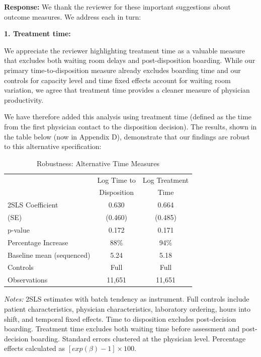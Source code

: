 \documentclass[11pt]{article}
\newcommand{\1}{\hbox{\rm 1\kern-.35em 1}}
\begin{document}
\noindent\textbf{Response:} \color{blue}We thank the reviewer for these important suggestions about outcome measures. We address each in turn:

\textbf{1. Treatment time:} 

We appreciate the reviewer highlighting treatment time as a valuable measure that excludes both waiting room delays and post-disposition boarding. While our primary time-to-disposition measure already excludes boarding time and our controls for capacity level and time fixed effects account for waiting room variation, we agree that treatment time provides a cleaner measure of physician productivity. 

We have therefore added this analysis using treatment time (defined as the time from the first physician contact to the disposition decision). The results, shown in the table below (now in Appendix D), demonstrate that our findings are robust to this alternative specification:

\begin{table}[H]
\centering
\caption*{Robustness: Alternative Time Measures}
\begin{threeparttable}
\begin{tabular}{lcc}
\toprule 
& Log Time to & Log Treatment \\ 
& Disposition & Time \\ 
\midrule
2SLS Coefficient & 0.630 & 0.664 \\
(SE) & (0.460) & (0.485) \\
p-value & 0.172 & 0.171 \\
\midrule
Percentage Increase & 88\% & 94\% \\
Baseline mean (sequenced) & 5.24 & 5.18 \\
\midrule
Controls & Full & Full \\
Observations & 11,651 & 11,651 \\
\bottomrule
\end{tabular}
\begin{tablenotes}
\footnotesize
\item \textit{Notes:} 2SLS estimates with batch tendency as instrument. Full controls include patient characteristics, physician characteristics, laboratory ordering, hours into shift, and temporal fixed effects. Time to disposition excludes post-decision boarding. Treatment time excludes both waiting time before assessment and post-decision boarding. Standard errors clustered at the physician level. Percentage effects calculated as $[exp(\beta)-1]\times 100$.
\end{tablenotes}
\end{threeparttable}
\end{table}
\end{document}
